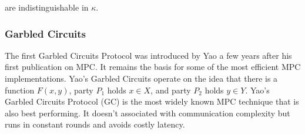 are indistinguishable in $\kappa$.



\subsubsection{Garbled Circuits}

The first Garbled Circuits Protocol was introduced by Yao a few years after his first publication on MPC. It
remains the basis for some of the most efficient MPC implementations. Yao's Garbled Circuits operate on
the idea that there is a function $F(x,y)$, party $P_1$ holds $x \in X$, and party $P_2$ holds $y \in Y$.
Yao's Garbled Circuits Protocol (GC) is the most widely known MPC technique that is also best
performing. It doesn't associated with communication complexity but runs in constant rounds and avoids
costly latency. 








